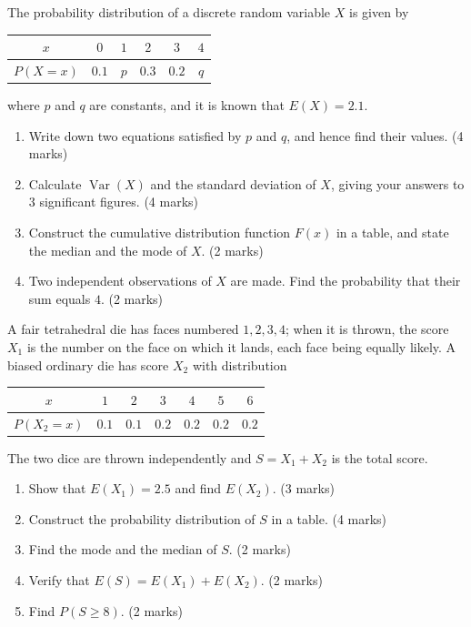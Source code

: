 \documentclass[11pt]{article}
\begin{document}
\begin{exercice}
The probability distribution of a discrete random variable $X$ is given by
\begin{center}
\begin{tabular}{|c|c|c|c|c|c|}
\hline
\rowcolor{popblueL} $x$ & $0$ & $1$ & $2$ & $3$ & $4$ \\
\hline
$P(X = x)$ & $0.1$ & $p$ & $0.3$ & $0.2$ & $q$ \\
\hline
\end{tabular}
\end{center}
where $p$ and $q$ are constants, and it is known that $E(X) = 2.1$.
\begin{enumerate}
\item Write down two equations satisfied by $p$ and $q$, and hence find their values. \hfill (4 marks)
\item Calculate $\operatorname{Var}(X)$ and the standard deviation of $X$, giving your answers to $3$ significant figures. \hfill (4 marks)
\item Construct the cumulative distribution function $F(x)$ in a table, and state the median and the mode of $X$. \hfill (2 marks)
\item Two independent observations of $X$ are made. Find the probability that their sum equals $4$. \hfill (2 marks)
\end{enumerate}
\end{exercice}

\begin{exercice}
A fair tetrahedral die has faces numbered $1, 2, 3, 4$; when it is thrown, the score $X_1$ is the number on the face on which it lands, each face being equally likely. A biased ordinary die has score $X_2$ with distribution
\begin{center}
\begin{tabular}{|c|c|c|c|c|c|c|}
\hline
\rowcolor{popblueL} $x$ & $1$ & $2$ & $3$ & $4$ & $5$ & $6$ \\
\hline
$P(X_2 = x)$ & $0.1$ & $0.1$ & $0.2$ & $0.2$ & $0.2$ & $0.2$ \\
\hline
\end{tabular}
\end{center}
The two dice are thrown independently and $S = X_1 + X_2$ is the total score.
\begin{enumerate}
\item Show that $E(X_1) = 2.5$ and find $E(X_2)$. \hfill (3 marks)
\item Construct the probability distribution of $S$ in a table. \hfill (4 marks)
\item Find the mode and the median of $S$. \hfill (2 marks)
\item Verify that $E(S) = E(X_1) + E(X_2)$. \hfill (2 marks)
\item Find $P(S \geq 8)$. \hfill (2 marks)
\end{enumerate}
\end{exercice}
\end{document}
